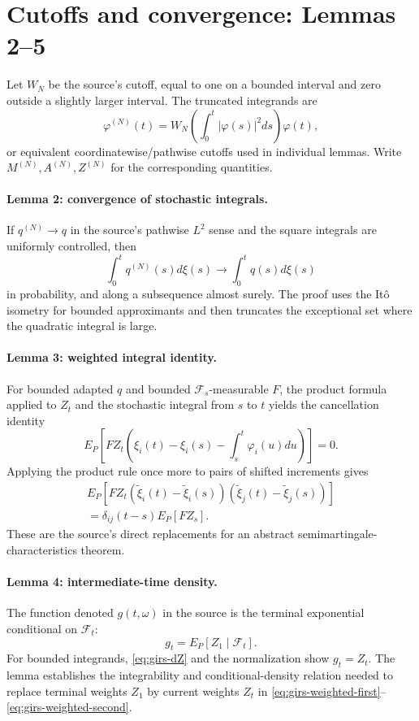 \section{Cutoffs and convergence: Lemmas 2--5}
Let \(W_N\) be the source's cutoff, equal to one on a bounded interval and zero outside a slightly
larger interval.  The truncated integrands are
\[
 \varphi^{(N)}(t)=W_N\!\left(\int_0^t|\varphi(s)|^2ds\right)\varphi(t),
\]
or equivalent coordinatewise/pathwise cutoffs used in individual lemmas.  Write
\(M^{(N)},A^{(N)},Z^{(N)}\) for the corresponding quantities.

\paragraph{Lemma 2: convergence of stochastic integrals.}
If \(q^{(N)}\to q\) in the source's pathwise \(L^2\) sense and the square integrals are uniformly
controlled, then
\[
 \int_0^tq^{(N)}(s)d\xi(s)
 \longrightarrow \int_0^tq(s)d\xi(s)
\]
in probability, and along a subsequence almost surely.  The proof uses the It\^o isometry for bounded
approximants and then truncates the exceptional set where the quadratic integral is large.

\paragraph{Lemma 3: weighted integral identity.}
For bounded adapted \(q\) and bounded \(\mathcal F_s\)-measurable \(F\), the product formula applied
to \(Z_t\) and the stochastic integral from \(s\) to \(t\) yields the cancellation identity
\begin{equation}\label{eq:girs-weighted-first}
 E_P\!\left[FZ_t\left(\xi_i(t)-\xi_i(s)-
      \int_s^t\varphi_i(u)du\right)\right]=0.
\end{equation}
Applying the product rule once more to pairs of shifted increments gives
\begin{multline}\label{eq:girs-weighted-second}
 E_P\!\left[FZ_t
  \left(\widetilde\xi_i(t)-\widetilde\xi_i(s)\right)
  \left(\widetilde\xi_j(t)-\widetilde\xi_j(s)\right)\right]\\
 =\delta_{ij}(t-s)E_P[FZ_s].
\end{multline}
These are the source's direct replacements for an abstract semimartingale-characteristics theorem.

\paragraph{Lemma 4: intermediate-time density.}
The function denoted \(g(t,\omega)\) in the source is the terminal exponential conditional on
\(\mathcal F_t\):
\[
 g_t=E_P[Z_1\mid\mathcal F_t].
\]
For bounded integrands, \eqref{eq:girs-dZ} and the normalization show \(g_t=Z_t\).  The lemma
establishes the integrability and conditional-density relation needed to replace terminal weights
\(Z_1\) by current weights \(Z_t\) in \eqref{eq:girs-weighted-first}--\eqref{eq:girs-weighted-second}.

